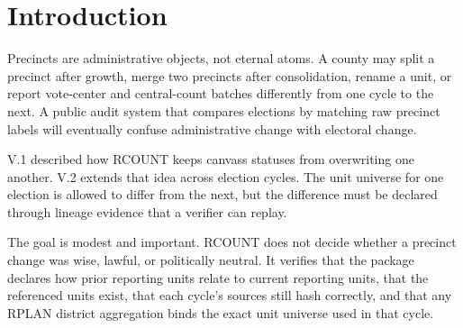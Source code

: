 \section{Introduction}

Precincts are administrative objects, not eternal atoms. A county may split a
precinct after growth, merge two precincts after consolidation, rename a unit,
or report vote-center and central-count batches differently from one cycle to
the next. A public audit system that compares elections by matching raw precinct
labels will eventually confuse administrative change with electoral change.

V.1 described how RCOUNT keeps canvass statuses from overwriting one another.
V.2 extends that idea across election cycles. The unit universe for one election
is allowed to differ from the next, but the difference must be declared through
lineage evidence that a verifier can replay.

The goal is modest and important. RCOUNT does not decide whether a precinct
change was wise, lawful, or politically neutral. It verifies that the package
declares how prior reporting units relate to current reporting units, that the
referenced units exist, that each cycle's sources still hash correctly, and
that any RPLAN district aggregation binds the exact unit universe used in that
cycle.
